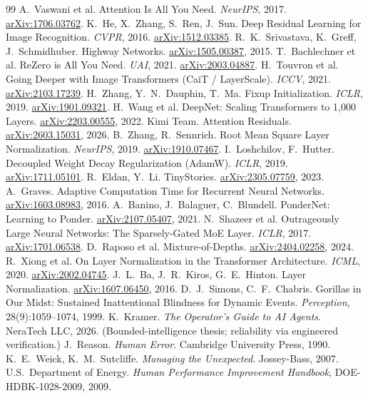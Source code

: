 \documentclass[11pt]{article}
\begin{document}
\begin{thebibliography}{99}
\small
{} A.~Vaswani et al. Attention Is All You Need. \emph{NeurIPS}, 2017. \href{https://arxiv.org/abs/1706.03762}{arXiv:1706.03762}.
 K.~He, X.~Zhang, S.~Ren, J.~Sun. Deep Residual Learning for Image Recognition. \emph{CVPR}, 2016. \href{https://arxiv.org/abs/1512.03385}{arXiv:1512.03385}.
 R.~K.~Srivastava, K.~Greff, J.~Schmidhuber. Highway Networks. \href{https://arxiv.org/abs/1505.00387}{arXiv:1505.00387}, 2015.
 T.~Bachlechner et al. ReZero is All You Need. \emph{UAI}, 2021. \href{https://arxiv.org/abs/2003.04887}{arXiv:2003.04887}.
 H.~Touvron et al. Going Deeper with Image Transformers (CaiT / LayerScale). \emph{ICCV}, 2021. \href{https://arxiv.org/abs/2103.17239}{arXiv:2103.17239}.
 H.~Zhang, Y.~N.~Dauphin, T.~Ma. Fixup Initialization. \emph{ICLR}, 2019. \href{https://arxiv.org/abs/1901.09321}{arXiv:1901.09321}.
 H.~Wang et al. DeepNet: Scaling Transformers to 1{,}000 Layers. \href{https://arxiv.org/abs/2203.00555}{arXiv:2203.00555}, 2022.
 Kimi Team. Attention Residuals. \href{https://arxiv.org/abs/2603.15031}{arXiv:2603.15031}, 2026.
 B.~Zhang, R.~Sennrich. Root Mean Square Layer Normalization. \emph{NeurIPS}, 2019. \href{https://arxiv.org/abs/1910.07467}{arXiv:1910.07467}.
 I.~Loshchilov, F.~Hutter. Decoupled Weight Decay Regularization (AdamW). \emph{ICLR}, 2019. \href{https://arxiv.org/abs/1711.05101}{arXiv:1711.05101}.
 R.~Eldan, Y.~Li. TinyStories. \href{https://arxiv.org/abs/2305.07759}{arXiv:2305.07759}, 2023.
 A.~Graves. Adaptive Computation Time for Recurrent Neural Networks. \href{https://arxiv.org/abs/1603.08983}{arXiv:1603.08983}, 2016.
 A.~Banino, J.~Balaguer, C.~Blundell. PonderNet: Learning to Ponder. \href{https://arxiv.org/abs/2107.05407}{arXiv:2107.05407}, 2021.
 N.~Shazeer et al. Outrageously Large Neural Networks: The Sparsely-Gated MoE Layer. \emph{ICLR}, 2017. \href{https://arxiv.org/abs/1701.06538}{arXiv:1701.06538}.
 D.~Raposo et al. Mixture-of-Depths. \href{https://arxiv.org/abs/2404.02258}{arXiv:2404.02258}, 2024.
 R.~Xiong et al. On Layer Normalization in the Transformer Architecture. \emph{ICML}, 2020. \href{https://arxiv.org/abs/2002.04745}{arXiv:2002.04745}.
 J.~L.~Ba, J.~R.~Kiros, G.~E.~Hinton. Layer Normalization. \href{https://arxiv.org/abs/1607.06450}{arXiv:1607.06450}, 2016.
 D.~J.~Simons, C.~F.~Chabris. Gorillas in Our Midst: Sustained Inattentional Blindness for Dynamic Events. \emph{Perception}, 28(9):1059--1074, 1999.
 K.~Kramer. \emph{The Operator's Guide to AI Agents}. NeraTech LLC, 2026. (Bounded-intelligence thesis; reliability via engineered verification.)
 J.~Reason. \emph{Human Error}. Cambridge University Press, 1990.
 K.~E.~Weick, K.~M.~Sutcliffe. \emph{Managing the Unexpected}. Jossey-Bass, 2007.
 U.S.\ Department of Energy. \emph{Human Performance Improvement Handbook}, DOE-HDBK-1028-2009, 2009.
\end{thebibliography}
\end{document}

